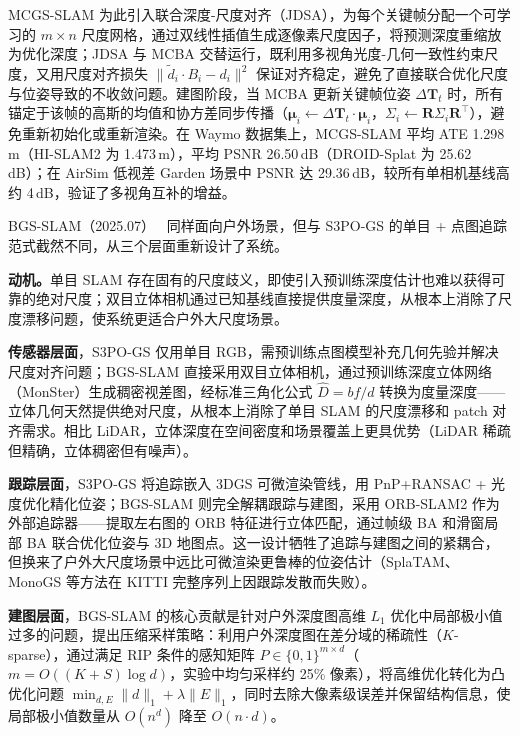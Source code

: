 MCGS-SLAM 为此引入联合深度-尺度对齐（JDSA），为每个关键帧分配一个可学习的 $m \times n$ 尺度网格，通过双线性插值生成逐像素尺度因子，将预测深度重缩放为优化深度；JDSA 与 MCBA 交替运行，既利用多视角光度-几何一致性约束尺度，又用尺度对齐损失 $\|\tilde{d}_i \cdot B_i - d_i\|^2$ 保证对齐稳定，避免了直接联合优化尺度与位姿导致的不收敛问题。建图阶段，当 MCBA 更新关键帧位姿 $\Delta\mathbf{T}_t$ 时，所有锚定于该帧的高斯的均值和协方差同步传播（$\boldsymbol{\mu}_i \leftarrow \Delta\mathbf{T}_t \cdot \boldsymbol{\mu}_i$，$\Sigma_i \leftarrow \mathbf{R}\Sigma_i\mathbf{R}^\top$），避免重新初始化或重新渲染。在 Waymo 数据集上，MCGS-SLAM 平均 ATE 1.298\,m（HI-SLAM2 为 1.473\,m），平均 PSNR 26.50\,dB（DROID-Splat 为 25.62\,dB）；在 AirSim 低视差 Garden 场景中 PSNR 达 29.36\,dB，较所有单相机基线高约 4\,dB，验证了多视角互补的增益。

BGS-SLAM（2025.07）~\cite{2507_23677} 同样面向户外场景，但与 S3PO-GS 的单目 + 点图追踪范式截然不同，从三个层面重新设计了系统。

\textbf{动机。}单目 SLAM 存在固有的尺度歧义，即使引入预训练深度估计也难以获得可靠的绝对尺度；双目立体相机通过已知基线直接提供度量深度，从根本上消除了尺度漂移问题，使系统更适合户外大尺度场景。

\textbf{传感器层面}，S3PO-GS 仅用单目 RGB，需预训练点图模型补充几何先验并解决尺度对齐问题；BGS-SLAM 直接采用双目立体相机，通过预训练深度立体网络（MonSter）生成稠密视差图，经标准三角化公式 $\hat{D} = bf/d$ 转换为度量深度——立体几何天然提供绝对尺度，从根本上消除了单目 SLAM 的尺度漂移和 patch 对齐需求。相比 LiDAR，立体深度在空间密度和场景覆盖上更具优势（LiDAR 稀疏但精确，立体稠密但有噪声）。

\textbf{跟踪层面}，S3PO-GS 将追踪嵌入 3DGS 可微渲染管线，用 PnP+RANSAC + 光度优化精化位姿；BGS-SLAM 则完全解耦跟踪与建图，采用 ORB-SLAM2 作为外部追踪器——提取左右图的 ORB 特征进行立体匹配，通过帧级 BA 和滑窗局部 BA 联合优化位姿与 3D 地图点。这一设计牺牲了追踪与建图之间的紧耦合，但换来了户外大尺度场景中远比可微渲染更鲁棒的位姿估计（SplaTAM、MonoGS 等方法在 KITTI 完整序列上因跟踪发散而失败）。

\textbf{建图层面}，BGS-SLAM 的核心贡献是针对户外深度图高维 $L_1$ 优化中局部极小值过多的问题，提出压缩采样策略：利用户外深度图在差分域的稀疏性（$K$-sparse），通过满足 RIP 条件的感知矩阵 $P \in \{0,1\}^{m \times d}$（$m = O((K+S)\log d)$，实验中均匀采样约 25\% 像素），将高维优化转化为凸优化问题 $\min_{d,E}\|d\|_1 + \lambda\|E\|_1$，同时去除大像素级误差并保留结构信息，使局部极小值数量从 $O(n^d)$ 降至 $O(n \cdot d)$。


